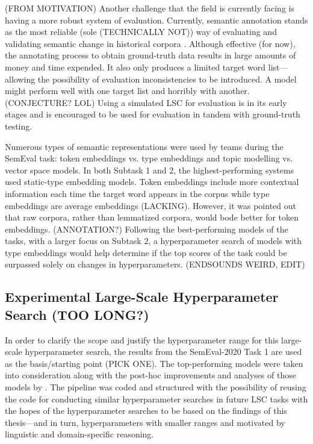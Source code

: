 (FROM MOTIVATION)
Another challenge that the field is currently facing is having a more robust system of evaluation. Currently, semantic annotation stands as the most reliable (sole (TECHNICALLY NOT)) way of evaluating and validating semantic change in historical corpora \citep{hengchen2021challenges}. Although effective (for now), the annotating process to obtain ground-truth data results in large amounts of money and time expended. It also only produces a limited target word list—allowing the possibility of evaluation inconsistencies to be introduced. A model might perform well with one target list and horribly with another. (CONJECTURE? LOL) Using a simulated LSC for evaluation is in its early stages and is encouraged to be used for evaluation in tandem with ground-truth testing.

Numerous types of semantic representations were used by teams during the SemEval task: token embeddings vs. type embeddings and topic modelling vs. vector space models. In both Subtask 1 and 2, the highest-performing systems used static-type embedding models. Token embeddings include more contextual information each time the target word appears in the corpus while type embeddings are average embeddings (LACKING). However, it was pointed out that raw corpora, rather than lemmatized corpora, would bode better for token embeddings. (ANNOTATION?) Following the best-performing models of the tasks, with a larger focus on Subtask 2, a hyperparameter search of models with type embeddings would help determine if the top scores of the task could be surpassed solely on changes in hyperparameters. (ENDSOUNDS WEIRD, EDIT) 

\subsection{Experimental Large-Scale Hyperparameter Search (TOO LONG?)}

In order to clarify the scope and justify the hyperparameter range for this large-scale hyperparameter search, the results from the SemEval-2020 Task 1 are used as the basis/starting point (PICK ONE). The top-performing models were taken into consideration along with the post-hoc improvements and analyses of those models by \citet{kaiser-etal-2020-ims}. The pipeline was coded and structured with the possibility of reusing the code for conducting similar hyperparameter searches in future LSC tasks with the hopes of the hyperparameter searches to be based on the findings of this thesis—and in turn, hyperparameters with smaller ranges and motivated by linguistic and domain-specific reasoning. 

